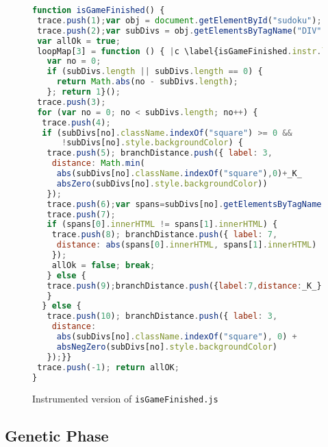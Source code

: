 \begin{figure}[!t]
  \tiny
  \begin{lstlisting}[style=htmlcssjs,language=JavaScript,basicstyle={\tiny\ttfamily}]
function isGameFinished() {
 trace.push(1);var obj = document.getElementById("sudoku"); |c \label{isGameFinished.instr.trace} |c
 trace.push(2);var subDivs = obj.getElementsByTagName("DIV");
 var allOk = true;
 loopMap[3] = function () { |c \label{isGameFinished.instr.loopMap} |c
   var no = 0;
   if (subDivs.length || subDivs.length == 0) {
     return Math.abs(no - subDivs.length);
   }; return 1}();
 trace.push(3);
 for (var no = 0; no < subDivs.length; no++) {
  trace.push(4);
  if (subDivs[no].className.indexOf("square") >= 0 &&
      !subDivs[no].style.backgroundColor) {
   trace.push(5); branchDistance.push({ label: 3,
    distance: Math.min(
     abs(subDivs[no].className.indexOf("square"),0)+_K_
     absZero(subDivs[no].style.backgroundColor))
   });
   trace.push(6);var spans=subDivs[no].getElementsByTagName("SPAN");
   trace.push(7);
   if (spans[0].innerHTML != spans[1].innerHTML) {
    trace.push(8); branchDistance.push({ label: 7,
     distance: abs(spans[0].innerHTML, spans[1].innerHTML)
    });
    allOk = false; break;
   } else {
   trace.push(9);branchDistance.push({label:7,distance:_K_});
   }
  } else {
   trace.push(10); branchDistance.push({ label: 3,
    distance:
     abs(subDivs[no].className.indexOf("square"), 0) +
     absNegZero(subDivs[no].style.backgroundColor)
   });}}
 trace.push(-1); return allOK;
}
\end{lstlisting}
  \caption{Instrumented version of \texttt{isGameFinished.js} }
  \label{code.isGameFinished.instr}
\end{figure}

\subsection{Genetic Phase}
\label{sub.sec.genetic.phase}

